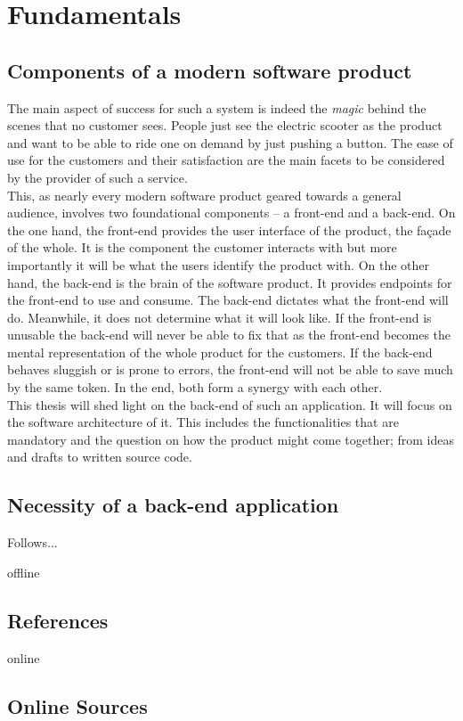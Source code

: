 \documentclass[12pt,a4paper]{report}
\begin{document}
\chapter{Fundamentals} \label{chap:fundamentals}


\section{Components of a modern software product}

The main aspect of success for such a system is indeed the \emph{magic} behind the scenes
that no customer sees. People just see the electric scooter as the product and
want to be able to ride one on demand by just pushing a button.
The ease of use for the customers and their satisfaction are the main facets
to be considered by the provider of such a service.\\
This, as nearly every modern software product geared towards a general audience,
involves two foundational components – a front-end and a back-end.
On the one hand, the front-end provides the user interface of the product, the façade of the whole.
It is the component the customer interacts with but more importantly it will be
what the users identify the product with.
On the other hand, the back-end is the brain of the software product.
It provides endpoints for the front-end to use and consume. The back-end dictates
what the front-end will do. Meanwhile, it does not determine what it will look like.
If the front-end is unusable the back-end will never be able to fix that as the
front-end becomes the mental representation of the whole product for the customers.
If the back-end behaves sluggish or is prone to errors, the front-end will not be able to save much
by the same token. In the end, both form a synergy with each other.\\
This thesis will shed light on the back-end of such an application.
It will focus on the software architecture of it.
This includes the functionalities that are mandatory and the question on how the product
might come together; from ideas and drafts to written source code.


\section{Necessity of a back-end application}

Follows...


\newpage



\begin{btSect}{offline}
\section*{References}
\btPrintCited
\end{btSect}
\begin{btSect}{online}
\section*{Online Sources}
\btPrintCited
\end{btSect}
\end{document}
